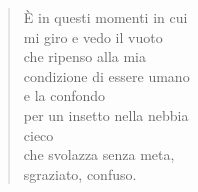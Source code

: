 
\begin{verse}
È in questi momenti in cui\\
mi giro e vedo il vuoto\\
che ripenso alla mia\\
condizione di essere umano\\
e la confondo\\
per un insetto nella nebbia\\
cieco\\
che svolazza senza meta,\\
sgraziato, confuso.





\end{verse}